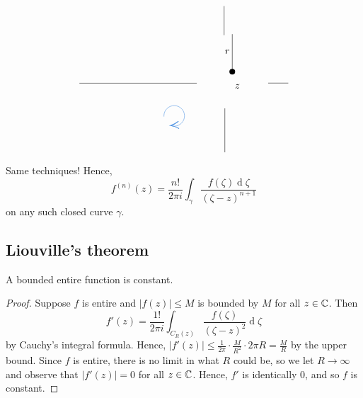 \documentclass[12pt]{article}
\renewcommand{\d}{\ensuremath{\operatorname{d}}}
\begin{document}
\[\begin{tikzpicture}[x=0.75pt,y=0.75pt,yscale=-1,xscale=1]
    \draw    (315.02,97.83) -- (315.02,148.43) ;
    \draw [shift={(315.02,148.43)}, rotate = 90] [color={rgb, 255:red, 0; green, 0; blue, 0 }  ][fill={rgb, 255:red, 0; green, 0; blue, 0 }  ][line width=0.75]      (0, 0) circle [x radius= 3.35, y radius= 3.35]   ;
    \draw    (109.26,164) -- (267.26,164) ;
    \draw    (363.26,163.86) -- (390.41,163.86) ;
    \draw    (305,198) -- (305,257.26) ;
    \draw    (304,60) -- (304,99.26) ;
    \draw  [draw opacity=0] (232.12,221.17) .. controls (233.6,221.71) and (235.2,222) .. (236.87,222) .. controls (244.53,222) and (250.74,215.79) .. (250.74,208.13) .. controls (250.74,200.47) and (244.53,194.26) .. (236.87,194.26) .. controls (229.21,194.26) and (223,200.47) .. (223,208.13) .. controls (223,208.44) and (223.01,208.74) .. (223.03,209.05) -- (236.87,208.13) -- cycle ; \draw [color={rgb, 255:red, 74; green, 144; blue, 226 }  ,draw opacity=1 ]   (234.05,221.71) .. controls (234.96,221.9) and (235.9,222) .. (236.87,222) .. controls (244.53,222) and (250.74,215.79) .. (250.74,208.13) .. controls (250.74,200.47) and (244.53,194.26) .. (236.87,194.26) .. controls (229.21,194.26) and (223,200.47) .. (223,208.13) .. controls (223,208.44) and (223.01,208.74) .. (223.03,209.05) ;  \draw [shift={(232.12,221.17)}, rotate = 355.35] [color={rgb, 255:red, 74; green, 144; blue, 226 }  ,draw opacity=1 ][line width=0.75]    (10.93,-4.9) .. controls (6.95,-2.3) and (3.31,-0.67) .. (0,0) .. controls (3.31,0.67) and (6.95,2.3) .. (10.93,4.9)   ;
    
    \draw (317.21,164.09) node [anchor=north west][inner sep=0.75pt]    {$z$};
    \draw (303.95,117.47) node [anchor=north west][inner sep=0.75pt]    {$r$};
    
    
    \end{tikzpicture}
    \]
Same techniques! Hence, \[f^{(n)}(z) = \frac{n!}{2\pi i}\int_{\gamma}\frac{f(\zeta)\d \zeta}{(\zeta-z)^{n+1}}\] on any such closed curve $\gamma$.

\subsection{Liouville's theorem}
\begin{theorem}[Liouville's]
    A bounded entire function  is constant.
\end{theorem}
\begin{proof}
    Suppose $f$ is entire and $|f(z)|\leq M$ is bounded by $M$ for all $z\in \mathbb{C}$. Then \[f'(z)=\frac{1!}{2\pi i}\int_{C_R(z)}\frac{f(\zeta)}{(\zeta-z)^2}\d \zeta\] by Cauchy's integral formula. Hence, $|f'(z)|\leq \frac{1}{2\pi}\cdot \frac{M}{R^2}\cdot 2\pi R=\frac{M}{R}$ by the upper bound. Since $f$ is entire, there is no limit in what $R$ could be, so we let $R\to \infty$ and observe that $|f'(z)|=0$ for all $z\in \mathbb{C}$. Hence, $f'$ is identically 0, and so $f$ is constant.
\end{proof}
\end{document}
